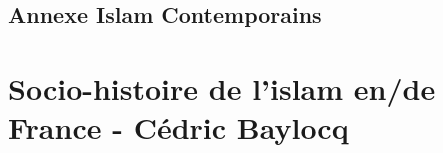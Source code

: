 \documentclass[oneside,10pt]{book} %
\begin{document}

%



\chapter{Annexe Islam Contemporains}




\part{Socio-histoire de l’islam en/de France - Cédric Baylocq}











% 
% 
% 

\backmatter


%

\listoftheorems[ignoreall,show={Def}]

\end{document}
